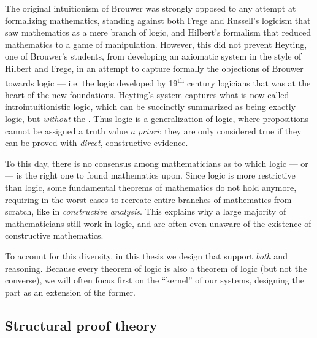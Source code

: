 The original intuitionism of Brouwer was strongly opposed to any attempt at
formalizing mathematics, standing against both Frege and Russell's logicism that
saw mathematics as a mere branch of logic, and Hilbert's formalism that reduced
mathematics to a game of  manipulation. However, this did not prevent
Heyting, one of Brouwer's students, from developing an axiomatic system in the
style of Hilbert and Frege, in an attempt to capture formally the objections of
Brouwer towards  logic --- i.e. the logic developed by
19\textsuperscript{th} century logicians that was at the heart of the new
 foundations. Heyting's system captures what is now called
\\intro{intuitionistic} logic, which can be succinctly summarized as being
exactly  logic, but \emph{without} the . Thus  logic is a generalization of 
logic, where propositions cannot be assigned a truth value \emph{a priori}: they
are only considered true if they can be proved with \emph{direct}, constructive
evidence.

To this day, there is no consensus among mathematicians as to which logic ---
 or  --- is the right one to found mathematics upon.
Since  logic is more restrictive than  logic, some
fundamental theorems of  mathematics do not hold anymore, requiring in
the worst cases to recreate entire branches of mathematics from scratch, like in
\emph{constructive analysis}. This explains why a large majority of
mathematicians still work in  logic, and are often even unaware of the
existence of constructive mathematics.

\begin{emphpar}
To account for this diversity, in this thesis we design  that
support \emph{both}  and  reasoning. Because every
theorem of  logic is also a theorem of  logic (but not
the converse), we will often focus first on the  ``kernel'' of our
systems, designing the  part as an extension of the former.
\end{emphpar}

\subsection{Structural proof theory}

